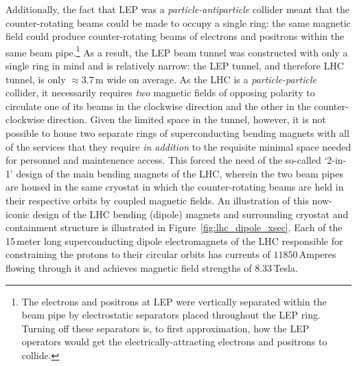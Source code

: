 Additionally, the fact that LEP was a \textit{particle-antiparticle} collider meant that the counter-rotating
beams could be made to occupy a single ring: the same magnetic field could produce counter-rotating beams of
electrons and positrons within the same beam pipe.\footnote{The electrons and positrons at LEP were vertically separated
within the beam pipe by electrostatic separators placed throughout the LEP ring. Turning off these separators
is, to first approximation, how the LEP operators would get the electrically-attracting electrons and positrons to collide.}
As a result, the LEP beam tunnel was constructed with only a single ring in mind and is relatively narrow: the LEP tunnel,
and therefore LHC tunnel, is only $\approx$3.7\,m wide on average.
As the LHC is a \textit{particle-particle} collider, it necessarily requires \textit{two} magnetic fields
of opposing polarity to circulate one of its beams in the clockwise direction and the other in the
counter-clockwise direction.
Given the limited space in the tunnel, however, it is not possible to house two separate rings
of superconducting bending magnets with all of the services that they require \textit{in addition} to the requisite
minimal space needed for personnel and maintenence access.
This forced the need of the so-called `2-in-1' design of the main bending magnets of the LHC, wherein the two
beam pipes are housed in the same cryostat in which the counter-rotating beams are held in their
respective orbits by coupled magnetic fields.
An illustration of this now-iconic design of the LHC bending (dipole) magnets and surrounding cryostat and containment structure is illustrated in Figure~\ref{fig:lhc_dipole_xsec}.
Each of the 15\,meter long superconducting dipole electromagnets of the LHC responsible for constraining the protons to their circular
orbits has currents of $11850$\,Amperes flowing through it and achieves magnetic field strengths of $8.33$\,Tesla.

